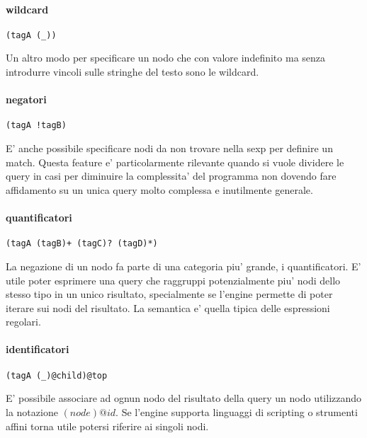 \paragraph{wildcard}

\begin{verbatim}
(tagA (_))
\end{verbatim}

Un altro modo per specificare un nodo che con valore indefinito ma senza introdurre vincoli sulle stringhe del testo sono le wildcard.

\paragraph{negatori}

\begin{verbatim}
(tagA !tagB)
\end{verbatim}

E' anche possibile specificare nodi da non trovare nella sexp per definire un match.
Questa feature e' particolarmente rilevante quando si vuole dividere le query in casi per diminuire la complessita' del programma non dovendo fare affidamento su un unica query molto complessa e inutilmente generale.

\paragraph{quantificatori}

\begin{verbatim}
(tagA (tagB)+ (tagC)? (tagD)*)
\end{verbatim}

La negazione di un nodo fa parte di una categoria piu' grande, i quantificatori.
E' utile poter esprimere una query che raggruppi potenzialmente piu' nodi dello stesso tipo in un unico risultato, specialmente se l'engine permette di poter iterare sui nodi del risultato.
La semantica e' quella tipica delle espressioni regolari.

\paragraph{identificatori}

\begin{verbatim}
(tagA (_)@child)@top
\end{verbatim}

E' possibile associare ad ognun nodo del risultato della query un nodo utilizzando la notazione $(node)@id$.
Se l'engine supporta linguaggi di scripting o strumenti affini torna utile potersi riferire ai singoli nodi.
